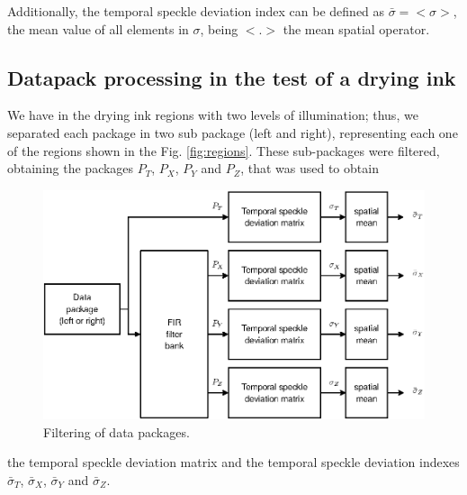 \documentclass[review]{elsarticle}
\begin{document}
Additionally, the temporal speckle deviation index can be defined as $\bar{\sigma}=<\sigma>$, the mean value
of all elements in $\sigma$, being $<.>$ the mean spatial operator.

\subsection{Datapack processing in the test of a drying ink}
\label{subsec:numprocink}

We have in the drying ink regions  with
two levels of illumination; thus, we  separated each package in two sub package
(left and right), representing each one of the regions shown in the Fig. \ref{fig:regions}.
These sub-packages were filtered,
obtaining the packages $P_T$, $P_X$, $P_Y$ and $P_Z$, that was used to obtain
\begin{figure}[h!]
\centering
\includegraphics[width=0.65\columnwidth]{filtering.eps}
\caption{Filtering of data packages.}
\label{fig:filtering}
\end{figure}

the temporal speckle deviation matrix and the 
temporal speckle deviation indexes $\bar{\sigma}_T$, $\bar{\sigma}_X$, $\bar{\sigma}_Y$ and
$\bar{\sigma}_Z$.
\end{document}
